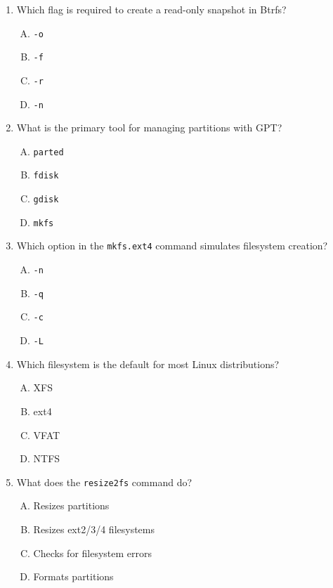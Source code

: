 \documentclass[a4paper]{report}
\begin{document}
\begin{enumerate}[1.]
    \item Which flag is required to create a read-only snapshot in Btrfs?  
    \begin{enumerate}[A)]
        \item \texttt{-o}  
        \item \texttt{-f}  
        \item \texttt{-r}  
        \item \texttt{-n}  
    \end{enumerate}

    \item What is the primary tool for managing partitions with GPT?  
    \begin{enumerate}[A)]
        \item \texttt{parted}  
        \item \texttt{fdisk}  
        \item \texttt{gdisk}  
        \item \texttt{mkfs}  
    \end{enumerate}

    \item Which option in the \texttt{mkfs.ext4} command simulates filesystem creation?  
    \begin{enumerate}[A)]
        \item \texttt{-n}  
        \item \texttt{-q}  
        \item \texttt{-c}  
        \item \texttt{-L}  
    \end{enumerate}

    \item Which filesystem is the default for most Linux distributions?  
    \begin{enumerate}[A)]
        \item XFS  
        \item ext4  
        \item VFAT  
        \item NTFS  
    \end{enumerate}

    \item What does the \texttt{resize2fs} command do?  
    \begin{enumerate}[A)]
        \item Resizes partitions  
        \item Resizes ext2/3/4 filesystems  
        \item Checks for filesystem errors  
        \item Formats partitions  
    \end{enumerate}


\end{enumerate}
\end{document}
